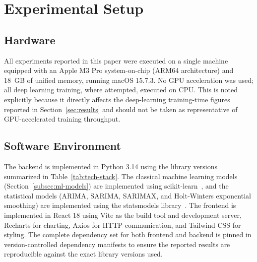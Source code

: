 \section{Experimental Setup}
\label{sec:experimental}

\subsection{Hardware}
All experiments reported in this paper were executed on a single machine equipped with an Apple M3 Pro system-on-chip (ARM64 architecture) and 18~GB of unified memory, running macOS 15.7.3. No GPU acceleration was used; all deep learning training, where attempted, executed on CPU. This is noted explicitly because it directly affects the deep-learning training-time figures reported in Section~\ref{sec:results} and should not be taken as representative of GPU-accelerated training throughput.

\subsection{Software Environment}
The backend is implemented in Python 3.14 using the library versions summarized in Table~\ref{tab:tech-stack}. The classical machine learning models (Section~\ref{subsec:ml-models}) are implemented using scikit-learn~\cite{pedregosa2011sklearn}, and the statistical models (ARIMA, SARIMA, SARIMAX, and Holt-Winters exponential smoothing) are implemented using the statsmodels library~\cite{seabold2010statsmodels}. The frontend is implemented in React 18 using Vite as the build tool and development server, Recharts for charting, Axios for HTTP communication, and Tailwind CSS for styling. The complete dependency set for both frontend and backend is pinned in version-controlled dependency manifests to ensure the reported results are reproducible against the exact library versions used.

